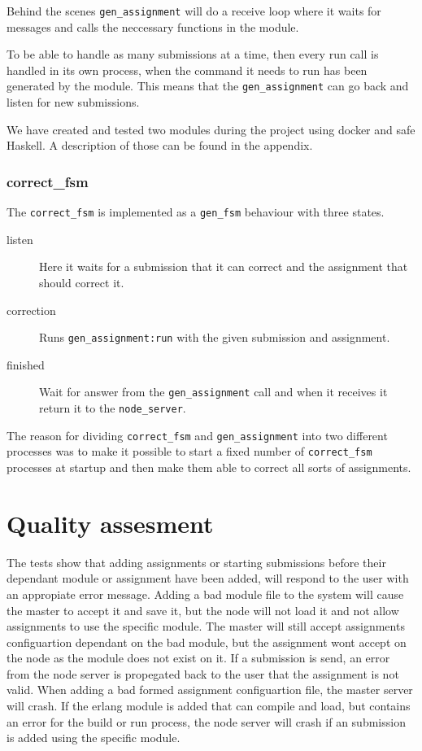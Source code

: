 Behind the scenes \texttt{gen\_assignment} will do a receive loop where it waits
for messages and calls the neccessary functions in the module.

To be able to handle as many submissions at a time, then every run call is
handled in its own process, when the command it needs to run has been generated
by the module. This means that the \texttt{gen\_assignment} can go back and
listen for new submissions.

We have created and tested two modules during the project using docker and safe
Haskell. A description of those can be found in the appendix.

\subsection{correct\_fsm}
The \texttt{correct\_fsm} is implemented as a \texttt{gen\_fsm} behaviour with
three states.
\begin{description}
    \item[listen] Here it waits for a submission that it can correct and the
    assignment that should correct it.
    \item[correction] Runs \texttt{gen\_assignment:run} with the given
    submission and assignment.
    \item[finished] Wait for answer from the \texttt{gen\_assignment} call and
    when it receives it return it to the \texttt{node\_server}.
\end{description}

The reason for dividing \texttt{correct\_fsm} and \texttt{gen\_assignment} into
two different processes was to make it possible to start a fixed number of
\texttt{correct\_fsm} processes at startup and then make them able to correct
all sorts of assignments.

\chapter{Quality assesment}


The tests show that adding assignments or starting submissions before their dependant module or assignment have been added, will respond to the user with an appropiate error message. Adding a bad module file to the system will cause the master to accept it and save it, but the node will not load it and not allow assignments to use the specific module. The master will still accept assignments configuartion dependant on the bad module, but the assignment wont accept on the node as the module does not exist on it. If a submission is send, an error from the node server is propegated back to the user that the assignment is not valid. When adding a bad formed assignment configuartion file, the master server will crash. If the erlang module is added that can compile and load, but contains an error for the build or run process, the node server will crash if an submission is added using the specific module.

